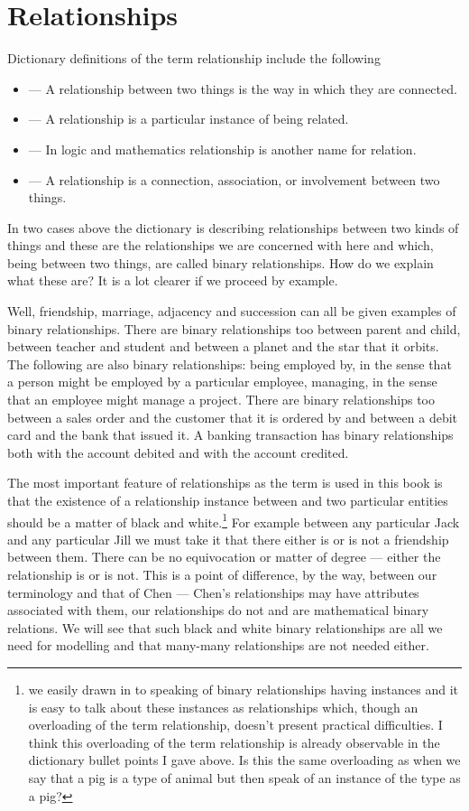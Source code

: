 \section{Relationships}
\mynote Dictionary definitions of the term relationship include the following
\begin{itemize}
\item --- A relationship between two things is the way in which they are connected.
\item --- A relationship is a particular instance of being related.
\item --- In logic and mathematics relationship is another name for relation.
\item --- A relationship is a connection, association, or involvement between two things.
\end{itemize}

\mynote In two cases above the dictionary is describing relationships between two kinds of things and these are the relationships we are concerned with here and which, being between two things, are called binary relationships. How do we explain what these are? It is a lot clearer if we proceed by example.

\mynote
Well, friendship,  marriage, adjacency and succession can all be given examples of binary relationships. There are binary relationships too  between parent and child, between teacher and student and between a planet and the star that it orbits.   
The following are also binary relationships:
being employed by, in the sense that a person might be employed by a particular employee,
managing, in the sense that an employee might manage a project. There are binary relationships too between a sales order and the customer that it is ordered by and between a debit card and  the bank that issued it. A banking transaction has binary relationships both with the account debited and with the account credited. 

\mynote The most important feature of relationships as the term is used  in this book is that the existence of a relationship instance between and two particular entities should be a matter of black and white.\footnote{we easily drawn in to speaking of binary relationships having instances and it is easy to talk about these instances as relationships which, though an overloading of the term relationship, doesn't present practical difficulties.
I think this overloading of the term relationship is already observable in the dictionary bullet points I gave above. Is this the same overloading as when we say that a pig is a type of animal but then speak of an instance of the type as a pig?} For example between any particular Jack and any particular Jill we must take it that there either is or is not a friendship between them. There can be no equivocation or matter of degree --- either the relationship is or is not. This is a point of difference, by the way, between our terminology and that of Chen --- Chen's relationships may have attributes associated with them, our relationships do not and are mathematical binary relations. We will see that such black and white binary relationships are all we need for modelling and that many-many relationships are not needed either. 

